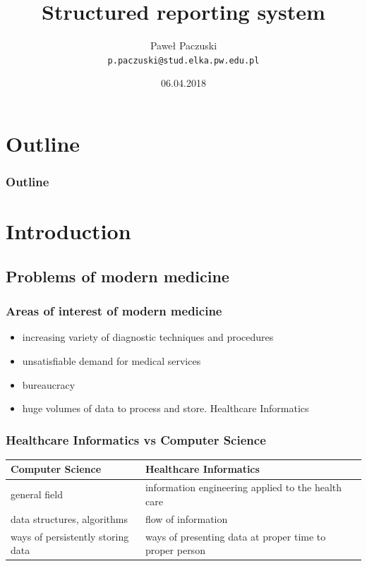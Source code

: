 \documentclass{beamer}
\author{Paweł Paczuski \\ \texttt{p.paczuski@stud.elka.pw.edu.pl}}
\title{Structured reporting system}
\date{06.04.2018}
\begin{document}
\begin{frame}
\titlepage
\end{frame}

\section*{Outline}
\begin{frame}
\frametitle{Outline}
\tableofcontents
\end{frame}

\section{Introduction}
\subsection{Problems of modern medicine}
\begin{frame}
\frametitle{Areas of interest of modern medicine}
\begin{itemize}
	\item increasing variety of diagnostic techniques and procedures
	\item unsatisfiable demand for medical services
	\item bureaucracy
	\item huge volumes of data to process and store. \alert{Healthcare Informatics}
\end{itemize}
\end{frame}

\begin{frame}
\frametitle{Healthcare Informatics vs Computer Science}
\begin{tabu}{XX}
	\rowfont{\bfseries\itshape\large} Computer Science & Healthcare Informatics\\
	\hline
	general field & information engineering applied to the health care \\ \hline
	data structures, algorithms & flow of information\\ \hline
	ways of persistently storing data        & ways of presenting data at proper time to proper person\\ \hline
\end{tabu}
\end{frame}
\end{document}
